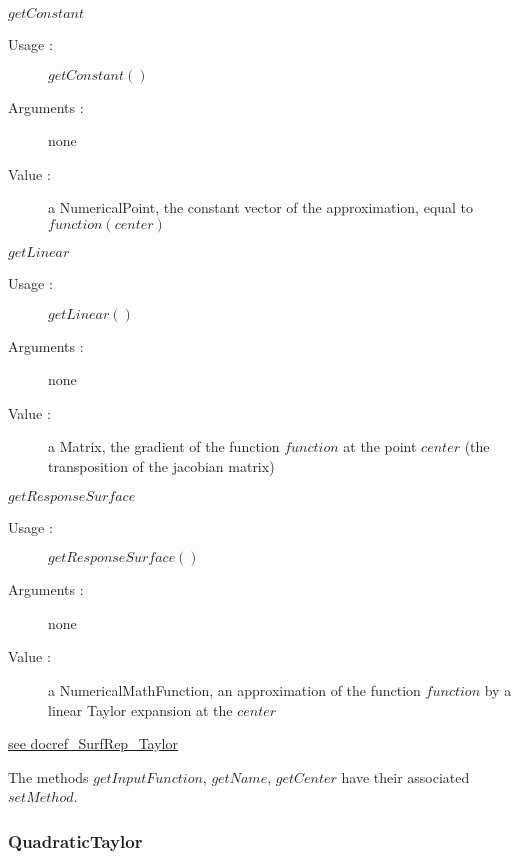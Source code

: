 \begin{description}
\begin{description}
  \item $getConstant$
    \begin{description}
    \item[Usage :] $getConstant()$
    \item[Arguments :] none
    \item[Value :] a NumericalPoint, the constant vector of the approximation, equal to $function(center)$
    \end{description}
    \bigskip

  \item $getLinear$
    \begin{description}
    \item[Usage :] $getLinear()$
    \item[Arguments :] none
    \item[Value :] a Matrix, the gradient of the function $function$ at the point $center$ (the transposition of the jacobian matrix)
    \end{description}
    \bigskip


  \item $getResponseSurface$
    \begin{description}
    \item[Usage :] $getResponseSurface()$ %
    \item[Arguments :] none
    \item[Value :] a NumericalMathFunction, an approximation of the function $function$ by a linear Taylor expansion at the $center$
    \end{description}
    \bigskip

  \end{description}

\item[Links :] \rule{0pt}{1em}
  \href{./Version/docref_SurfRep_Taylor_en.pdf}{see docref\_SurfRep\_Taylor}
\end{description}

The methods $getInputFunction$, $getName$, $getCenter$ have their associated $setMethod$.



\newpage \subsubsection{QuadraticTaylor}

